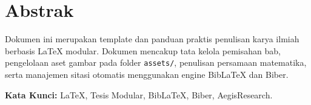 \section*{Abstrak}
Dokumen ini merupakan template dan panduan praktis penulisan karya ilmiah berbasis LaTeX modular. Dokumen mencakup tata kelola pemisahan bab, pengelolaan aset gambar pada folder \texttt{assets/}, penulisan persamaan matematika, serta manajemen sitasi otomatis menggunakan engine BibLaTeX dan Biber.

\vspace{0.5em}
\noindent\textbf{Kata Kunci:} LaTeX, Tesis Modular, BibLaTeX, Biber, AegisResearch.
